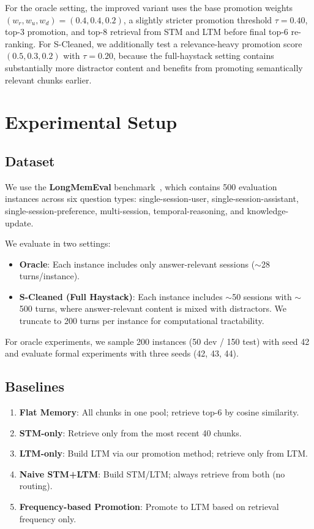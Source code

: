\documentclass{article}
\begin{document}
For the oracle setting, the improved variant uses the base promotion weights $(w_r, w_u, w_d)=(0.4,0.4,0.2)$, a slightly stricter promotion threshold $\tau=0.40$, top-3 promotion, and top-8 retrieval from STM and LTM before final top-6 re-ranking. For S-Cleaned, we additionally test a relevance-heavy promotion score $(0.5,0.3,0.2)$ with $\tau=0.20$, because the full-haystack setting contains substantially more distractor content and benefits from promoting semantically relevant chunks earlier.

\section{Experimental Setup}

\subsection{Dataset}

We use the \textbf{LongMemEval} benchmark~\cite{longmemeval}, which contains 500 evaluation instances across six question types: single-session-user, single-session-assistant, single-session-preference, multi-session, temporal-reasoning, and knowledge-update.

We evaluate in two settings:
\begin{itemize}
    \item \textbf{Oracle}: Each instance includes only answer-relevant sessions ($\sim$28 turns/instance).
    \item \textbf{S-Cleaned (Full Haystack)}: Each instance includes $\sim$50 sessions with $\sim$500 turns, where answer-relevant content is mixed with distractors. We truncate to 200 turns per instance for computational tractability.
\end{itemize}

For oracle experiments, we sample 200 instances (50 dev / 150 test) with seed 42 and evaluate formal experiments with three seeds (42, 43, 44).

\subsection{Baselines}

\begin{enumerate}
    \item \textbf{Flat Memory}: All chunks in one pool; retrieve top-6 by cosine similarity.
    \item \textbf{STM-only}: Retrieve only from the most recent 40 chunks.
    \item \textbf{LTM-only}: Build LTM via our promotion method; retrieve only from LTM.
    \item \textbf{Naive STM+LTM}: Build STM/LTM; always retrieve from both (no routing).
    \item \textbf{Frequency-based Promotion}: Promote to LTM based on retrieval frequency only.
\end{enumerate}
\end{document}
